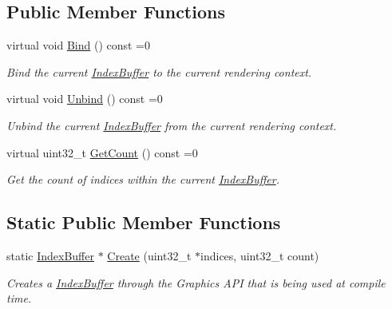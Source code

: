 \subsection*{Public Member Functions}
\begin{DoxyCompactItemize}
\item 
\mbox{\label{classengine_1_1renderer_1_1IndexBuffer_a050664f22cc88b809bc386c1e4dba359}} 
virtual void \hyperlink{classengine_1_1renderer_1_1IndexBuffer_a050664f22cc88b809bc386c1e4dba359}{Bind} () const =0
\begin{DoxyCompactList}\small\item\em Bind the current \hyperlink{classengine_1_1renderer_1_1IndexBuffer}{Index\+Buffer} to the current rendering context. \end{DoxyCompactList}\item 
virtual void \hyperlink{classengine_1_1renderer_1_1IndexBuffer_a8fd1ab43d3963533370c4d8e2e2282f4}{Unbind} () const =0
\begin{DoxyCompactList}\small\item\em Unbind the current \hyperlink{classengine_1_1renderer_1_1IndexBuffer}{Index\+Buffer} from the current rendering context. \end{DoxyCompactList}\item 
\mbox{\label{classengine_1_1renderer_1_1IndexBuffer_a42571fcc830427648852258124e92844}} 
virtual uint32\+\_\+t \hyperlink{classengine_1_1renderer_1_1IndexBuffer_a42571fcc830427648852258124e92844}{Get\+Count} () const =0
\begin{DoxyCompactList}\small\item\em Get the count of indices within the current \hyperlink{classengine_1_1renderer_1_1IndexBuffer}{Index\+Buffer}. \end{DoxyCompactList}\end{DoxyCompactItemize}
\subsection*{Static Public Member Functions}
\begin{DoxyCompactItemize}
\item 
static \hyperlink{classengine_1_1renderer_1_1IndexBuffer}{Index\+Buffer} $\ast$ \hyperlink{classengine_1_1renderer_1_1IndexBuffer_a2a4773cdd0dab8101ca9662ff6c0a460}{Create} (uint32\+\_\+t $\ast$indices, uint32\+\_\+t count)
\begin{DoxyCompactList}\small\item\em Creates a \hyperlink{classengine_1_1renderer_1_1IndexBuffer}{Index\+Buffer} through the Graphics A\+PI that is being used at compile time. \end{DoxyCompactList}\end{DoxyCompactItemize}



